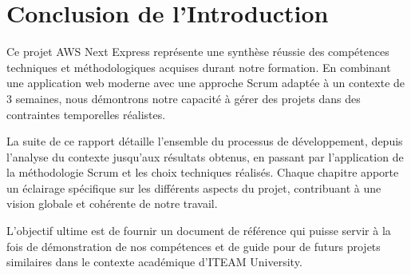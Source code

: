 \section{Conclusion de l'Introduction}

Ce projet AWS Next Express représente une synthèse réussie des compétences techniques et méthodologiques acquises durant notre formation. En combinant une application web moderne avec une approche Scrum adaptée à un contexte de 3 semaines, nous démontrons notre capacité à gérer des projets dans des contraintes temporelles réalistes.

La suite de ce rapport détaille l'ensemble du processus de développement, depuis l'analyse du contexte jusqu'aux résultats obtenus, en passant par l'application de la méthodologie Scrum et les choix techniques réalisés. Chaque chapitre apporte un éclairage spécifique sur les différents aspects du projet, contribuant à une vision globale et cohérente de notre travail.

L'objectif ultime est de fournir un document de référence qui puisse servir à la fois de démonstration de nos compétences et de guide pour de futurs projets similaires dans le contexte académique d'ITEAM University. 